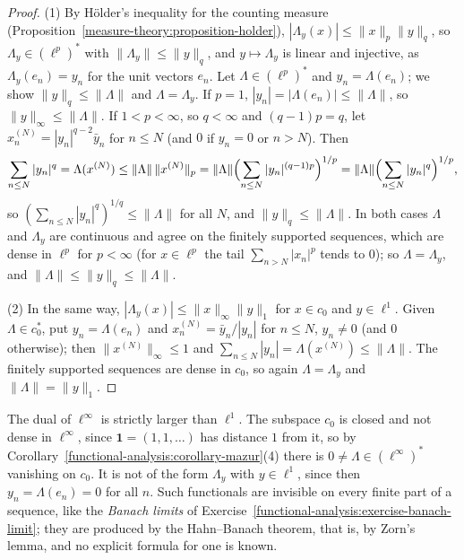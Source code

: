 \begin{proof}
(1) By H\"older's inequality for the counting measure (Proposition~\ref{measure-theory:proposition-holder}), $|\Lambda_y(x)| \leq \|x\|_p\|y\|_q$, so $\Lambda_y \in (\ell^p)^*$ with $\|\Lambda_y\| \leq \|y\|_q$, and
$y \mapsto \Lambda_y$ is linear and injective, as $\Lambda_y(e_n) = y_n$ for the unit vectors $e_n$. Let $\Lambda \in (\ell^p)^*$ and $y_n = \Lambda(e_n)$; we show $\|y\|_q \leq \|\Lambda\|$ and $\Lambda = \Lambda_y$. If $p = 1$,
$|y_n| = |\Lambda(e_n)| \leq \|\Lambda\|$, so $\|y\|_\infty \leq \|\Lambda\|$. If $1 < p < \infty$, so $q < \infty$ and $(q - 1)p = q$, let $x^{(N)}_n = |y_n|^{q-2}\bar y_n$ for $n \leq N$ (and $0$ if $y_n = 0$ or $n > N$).
Then
\[
\sum_{n \leq N}|y_n|^q = \Lambda(x^{(N)}) \leq \|\Lambda\|\,\|x^{(N)}\|_p = \|\Lambda\|\Bigl(\sum_{n \leq N}|y_n|^{(q-1)p}\Bigr)^{1/p} = \|\Lambda\|\Bigl(\sum_{n \leq N}|y_n|^q\Bigr)^{1/p},
\]
so $(\sum_{n \leq N}|y_n|^q)^{1/q} \leq \|\Lambda\|$ for all $N$, and $\|y\|_q \leq \|\Lambda\|$. In both cases $\Lambda$ and $\Lambda_y$ are continuous and agree on the finitely supported sequences, which are dense in
$\ell^p$ for $p < \infty$ (for $x \in \ell^p$ the tail $\sum_{n > N}|x_n|^p$ tends to $0$); so $\Lambda = \Lambda_y$, and $\|\Lambda\| \leq \|y\|_q \leq \|\Lambda\|$.

(2) In the same way, $|\Lambda_y(x)| \leq \|x\|_\infty\|y\|_1$ for $x \in c_0$ and $y \in \ell^1$. Given $\Lambda \in c_0^*$, put $y_n = \Lambda(e_n)$ and $x^{(N)}_n = \bar y_n/|y_n|$ for $n \leq N$, $y_n \neq 0$ (and $0$
otherwise); then $\|x^{(N)}\|_\infty \leq 1$ and $\sum_{n \leq N}|y_n| = \Lambda(x^{(N)}) \leq \|\Lambda\|$. The finitely supported sequences are dense in $c_0$, so again $\Lambda = \Lambda_y$ and $\|\Lambda\| = \|y\|_1$.
\end{proof}

The dual of $\ell^\infty$ is strictly larger than $\ell^1$. The subspace $c_0$ is closed and not dense in $\ell^\infty$, since $\mathbf{1} = (1, 1, \ldots)$ has distance $1$ from it, so by
Corollary~\ref{functional-analysis:corollary-mazur}(4) there is $0 \neq \Lambda \in (\ell^\infty)^*$ vanishing on $c_0$. It is not of the form $\Lambda_y$ with $y \in \ell^1$, since then $y_n = \Lambda(e_n) = 0$ for all
$n$. Such functionals are invisible on every finite part of a sequence, like the \emph{Banach limits} of Exercise~\ref{functional-analysis:exercise-banach-limit}; they are produced by the Hahn--Banach theorem, that is, by
Zorn's lemma, and no explicit formula for one is known.

